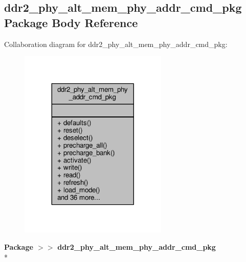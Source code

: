 \subsection{ddr2\+\_\+phy\+\_\+alt\+\_\+mem\+\_\+phy\+\_\+addr\+\_\+cmd\+\_\+pkg Package Body Reference}
\label{class__ddr2__phy__alt__mem__phy__addr__cmd__pkg}


Collaboration diagram for ddr2\+\_\+phy\+\_\+alt\+\_\+mem\+\_\+phy\+\_\+addr\+\_\+cmd\+\_\+pkg\+:\nopagebreak
\begin{figure}[H]
\begin{center}
\leavevmode
\includegraphics[width=200pt]{dc/dd5/class__ddr2__phy__alt__mem__phy__addr__cmd__pkg__coll__graph}
\end{center}
\end{figure}
{\bfseries Package $>$$>$ }{\bf ddr2\+\_\+phy\+\_\+alt\+\_\+mem\+\_\+phy\+\_\+addr\+\_\+cmd\+\_\+pkg}\\*
